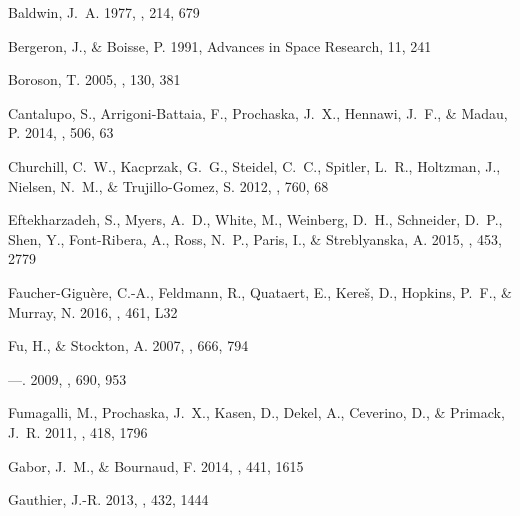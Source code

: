 \documentclass[iop]{emulateapj}
\begin{document}
{\begin{thebibliography}{52}
{Baldwin}, J.~A. 1977, \apj, 214, 679

{Bergeron}, J., \& {Boisse}, P. 1991, Advances in Space Research, 11, 241

{Boroson}, T. 2005, \aj, 130, 381

{Cantalupo}, S., {Arrigoni-Battaia}, F., {Prochaska}, J.~X., {Hennawi}, J.~F.,
  \& {Madau}, P. 2014, \nat, 506, 63

{Churchill}, C.~W., {Kacprzak}, G.~G., {Steidel}, C.~C., {Spitler}, L.~R.,
  {Holtzman}, J., {Nielsen}, N.~M., \& {Trujillo-Gomez}, S. 2012, \apj, 760, 68

{Eftekharzadeh}, S., {Myers}, A.~D., {White}, M., {Weinberg}, D.~H.,
  {Schneider}, D.~P., {Shen}, Y., {Font-Ribera}, A., {Ross}, N.~P., {Paris},
  I., \& {Streblyanska}, A. 2015, \mnras, 453, 2779

{Faucher-Gigu{\`e}re}, C.-A., {Feldmann}, R., {Quataert}, E., {Kere{\v s}}, D.,
  {Hopkins}, P.~F., \& {Murray}, N. 2016, \mnras, 461, L32

{Fu}, H., \& {Stockton}, A. 2007, \apj, 666, 794

---. 2009, \apj, 690, 953

{Fumagalli}, M., {Prochaska}, J.~X., {Kasen}, D., {Dekel}, A., {Ceverino}, D.,
  \& {Primack}, J.~R. 2011, \mnras, 418, 1796

{Gabor}, J.~M., \& {Bournaud}, F. 2014, \mnras, 441, 1615

{Gauthier}, J.-R. 2013, \mnras, 432, 1444


\end{thebibliography}}
\end{document}
